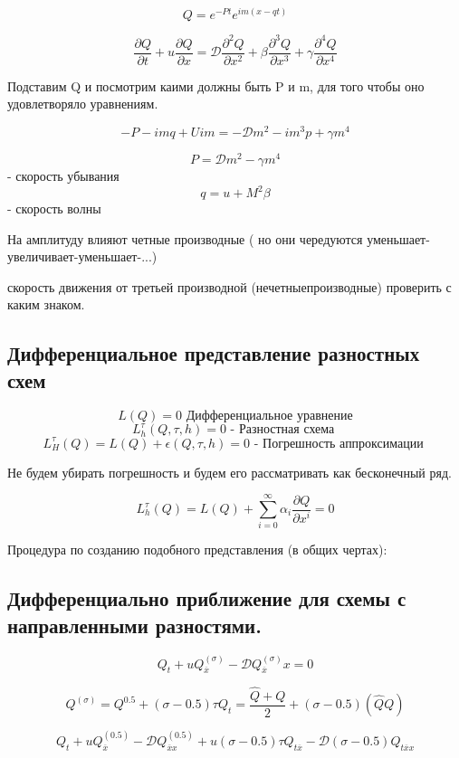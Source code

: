 \documentclass[12pt, a4paper]{article}
\begin{document}
\[ Q = e^{-P t } e^{im(x-qt)} \]

\[ \frac{\partial Q }{\partial t} + u \frac{\partial Q }{\partial x } = \mathcal{D } \frac{\partial^2 Q }{\partial x^2 } + \beta \frac{\partial^3 Q }{\partial x^3 } + \gamma \frac{\partial^4 Q }{\partial x^4} \]

Подставим Q и посмотрим каими должны быть P и m, для того чтобы оно удовлетворяло уравнениям.

\[ -P - i m q + U i m = - \mathcal{D} m^2 - i m^3 p + \gamma m^4 \]

\[ P = \mathcal{D }m^2 - \gamma m^4 \] - скорость убывания
\[ q = u + M^2 \beta \] - скорость волны

На амплитуду влияют четные производные ( но они чередуются уменьшает-увеличивает-уменьшает-...)

скорость движения от третьей производной (нечетныепроизводные) проверить с каким знаком.

\subsection{Дифференциальное представление разностных схем}

\[ L(Q) = 0 \textrm{ Дифференциальное уравнение} \]
\[ L^{\tau}_h (Q, \tau, h) = 0 \textrm{ - Разностная схема } \]
\[ L_H^{\tau} (Q) = L(Q) + \epsilon(Q, \tau, h) = 0 \textrm{ - Погрешность аппроксимации } \]

Не будем убирать погрешность и будем его рассматривать как бесконечный ряд.

\[ L_h^{\tau} (Q) = L(Q) + \sum_{i=0}^{\infty} \alpha_i \frac{\partial Q }{\partial x^i } = 0 \]

Процедура по созданию подобного представления (в общих чертах):

\subsection{Дифференциально приближение для схемы с направленными разностями.}

\[ Q_t + u Q^{(\sigma)}_{\overline{x}} - \mathcal{D} Q^{(\sigma)}_{\overline{x}} x = 0 \]

\[ Q^{(\sigma)} = Q^{0.5} + (\sigma - 0.5) \tau Q_t = \frac{\hat{Q} + Q}{2} + (\sigma - 0.5) (\hat{Q} Q)\]

\[ Q_t + u Q^{(0.5)}_{\overline{x}} - \mathcal{D} Q^{(0.5)}_{\overline{x} x} + u(\sigma - 0.5) \tau Q_{t \overline{x }} - \mathcal{D }(\sigma-0.5) Q_{t \overline{x} x} \]
\end{document}
